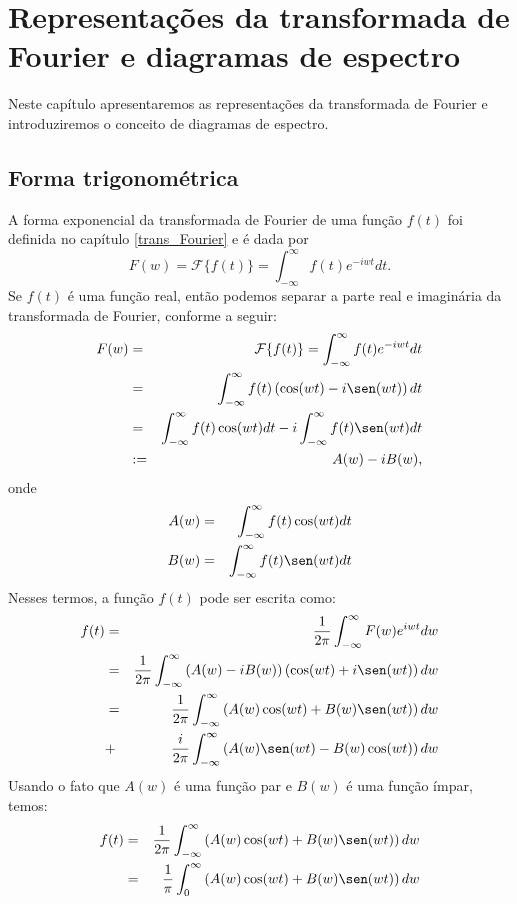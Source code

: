 \chapter{Representações da transformada de Fourier e diagramas de espectro}
Neste capítulo apresentaremos as representações da transformada de Fourier e introduziremos o conceito de diagramas de espectro.
\section{Forma trigonométrica}
A forma exponencial da transformada de Fourier de uma função $f(t)$ foi definida no capítulo \ref{trans_Fourier} e é dada por
\begin{equation}
F(w)=\mathcal{F}\{f(t)\}=\int_{-\infty}^\infty f(t)e^{-iwt}dt.
\end{equation}
Se $f(t)$ é uma função real, então podemos separar a parte real e imaginária da transformada de Fourier, conforme a seguir:
\begin{eqnarray*}
F(w)&=&\mathcal{F}\{f(t)\}=\int_{-\infty}^\infty f(t)e^{-iwt}dt\\
&=&\int_{-\infty}^\infty f(t)\left(\cos(wt)-i\sen(wt)\right)dt\\
&=&\int_{-\infty}^\infty f(t)\cos(wt)dt-i\int_{-\infty}^\infty f(t)\sen(wt) dt\\
&:=&A(w)-iB(w),
\end{eqnarray*}
onde
\begin{eqnarray*}
A(w)&=&\int_{-\infty}^\infty f(t)\cos(wt)dt\\
B(w)&=&\int_{-\infty}^\infty f(t)\sen(wt) dt
\end{eqnarray*}
Nesses termos, a função $f(t)$ pode ser escrita como:
\begin{eqnarray*}
f(t)&=&\frac{1}{2\pi}\int_{-\infty}^\infty F(w)e^{iwt}dw\\
&=&\frac{1}{2\pi}\int_{-\infty}^\infty \left(A(w)-i B(w)\right)\left(\cos(wt)+i\sen(wt)\right)dw\\
&=&\frac{1}{2\pi}\int_{-\infty}^\infty\left( A(w)\cos(wt)+ B(w)\sen(wt)\right)dw\\&+&\frac{i}{2\pi}\int_{-\infty}^\infty \left(A(w)\sen(wt)- B(w)\cos(wt)\right)dw
\end{eqnarray*}
Usando o fato que $A(w)$ é uma função par e $B(w)$ é uma função ímpar, temos:
\begin{eqnarray*}
f(t)&=&\frac{1}{2\pi}\int_{-\infty}^\infty\left(A(w)\cos(wt)+ B(w)\sen(wt)\right)dw\\
&=&\frac{1}{\pi}\int_{0}^\infty\left( A(w)\cos(wt)+ B(w)\sen(wt)\right)dw
\end{eqnarray*}
